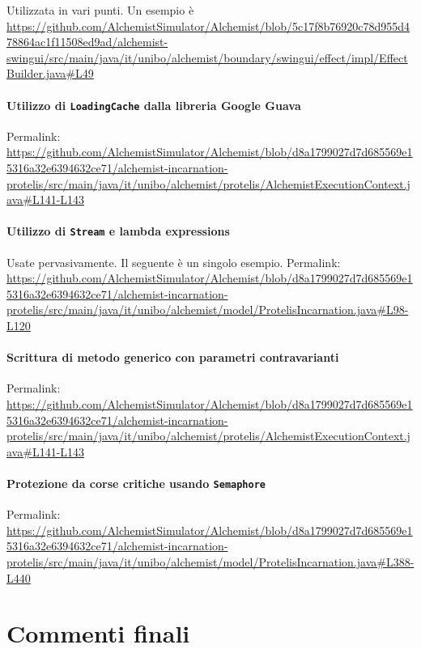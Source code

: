\documentclass[a4paper,12pt]{report}
\begin{document}
Utilizzata in vari punti.
Un esempio è \url{https://github.com/AlchemistSimulator/Alchemist/blob/5c17f8b76920c78d955d478864ac1f11508ed9ad/alchemist-swingui/src/main/java/it/unibo/alchemist/boundary/swingui/effect/impl/EffectBuilder.java#L49}

\subsubsection{Utilizzo di \texttt{LoadingCache} dalla libreria Google Guava}

Permalink: \url{https://github.com/AlchemistSimulator/Alchemist/blob/d8a1799027d7d685569e15316a32e6394632ce71/alchemist-incarnation-protelis/src/main/java/it/unibo/alchemist/protelis/AlchemistExecutionContext.java#L141-L143}

\subsubsection{Utilizzo di \texttt{Stream} e lambda expressions}

Usate pervasivamente. Il seguente è un singolo esempio.
Permalink: \url{https://github.com/AlchemistSimulator/Alchemist/blob/d8a1799027d7d685569e15316a32e6394632ce71/alchemist-incarnation-protelis/src/main/java/it/unibo/alchemist/model/ProtelisIncarnation.java#L98-L120}

\subsubsection{Scrittura di metodo generico con parametri contravarianti}

Permalink: \url{https://github.com/AlchemistSimulator/Alchemist/blob/d8a1799027d7d685569e15316a32e6394632ce71/alchemist-incarnation-protelis/src/main/java/it/unibo/alchemist/protelis/AlchemistExecutionContext.java#L141-L143}

\subsubsection{Protezione da corse critiche usando \texttt{Semaphore}}

Permalink: \url{https://github.com/AlchemistSimulator/Alchemist/blob/d8a1799027d7d685569e15316a32e6394632ce71/alchemist-incarnation-protelis/src/main/java/it/unibo/alchemist/model/ProtelisIncarnation.java#L388-L440}


\chapter{Commenti finali}
\end{document}
